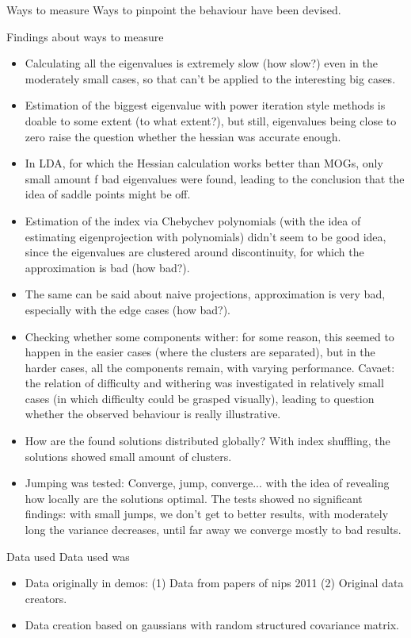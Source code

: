 \documentclass[11pt]{article}
\begin{document}
\begin{section}{Ways to measure}
	\noindent
	Ways to pinpoint the behaviour have been devised.
	\begin{subsection}{Findings about ways to measure}
		\begin{itemize}
			\item Calculating all the eigenvalues is extremely slow (how slow?) even in the moderately small cases, so that can't be applied to the interesting big cases.
			\item Estimation of the biggest eigenvalue with power iteration style methods is doable to some extent (to what extent?), but still, eigenvalues being close to zero raise the question whether the hessian was accurate enough.
			\item In LDA, for which the Hessian calculation works better than MOGs, only small amount f bad eigenvalues were found, leading to the conclusion that the idea of saddle points might be off.
			\item Estimation of the index via Chebychev polynomials (with the idea of estimating eigenprojection with polynomials) didn't seem to be good idea, since the eigenvalues are clustered around discontinuity, for which the approximation is bad (how bad?).
			\item The same can be said about naive projections, approximation is very bad, especially with the edge cases (how bad?).
			\item Checking whether some components wither: for some reason, this seemed to happen in the easier cases (where the clusters are separated), but in the harder cases, all the components remain, with varying performance. Cavaet: the relation of difficulty and withering was investigated in relatively small cases (in which difficulty could be grasped visually), leading to question whether the observed behaviour is really illustrative.
			\item How are the found solutions distributed globally? With index shuffling, the solutions showed small amount of clusters.
			\item Jumping was tested: Converge, jump, converge... with the idea of revealing how locally are the solutions optimal. The tests showed no significant findings: with small jumps, we don't get to better results, with moderately long the variance decreases, until far away we converge mostly to bad results.
		\end{itemize}
	\end{subsection}
\end{section}

\begin{section}{Data used}
	\noindent
	Data used was
	\begin{itemize}
		\item Data originally in demos: (1) Data from papers of nips 2011 (2) Original data creators.
		\item Data creation based on gaussians with random structured covariance matrix.
	\end{itemize}
\end{section}
\end{document}
